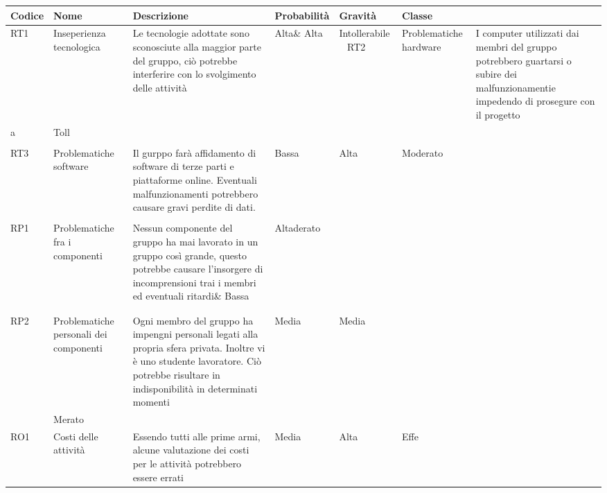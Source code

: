 \begin{longtable}[h]{|l|p{2.5cm}|p{4.4cm}|p{2.2cm}|l|l|}

		\hline
		\textbf{Codice} & \textbf{Nome}  & \textbf{Descrizione} & \textbf{Probabilità} & \textbf{Gravità} & \textbf{Classe} \\
		\hline
		RT1    & Inseperienza tecnologica & Le tecnologie adottate sono sconosciute alla maggior parte del gruppo, ciò potrebbe interferire con lo svolgimento delle  attività & Alta\& Alta    & Intollerabile  \	\hline
		RT2    & Problematiche hardware & I computer utilizzati dai membri del gruppo potrebbero guartarsi o subire dei malfunzionamentie impedendo di prosegure con il progetto\\                     a   & Toll\\                                                                                                                              	\hline   \\
		RT3    & Problematiche software & Il gurppo farà affidamento di software di terze parti e piattaforme online. Eventuali malfunzionamenti potrebbero causare gravi perdite di dati. & Bassa & Alta    & Moderato \\      \hline      \\
		RP1    & Problematiche fra i componenti & Nessun componente del gruppo ha mai lavorato in un gruppo così grande, questo potrebbe causare l'insorgere di incomprensioni trai i membri ed eventuali ritardi\& Bassa         & Altaderato \\                                                                                              \hline\\     \\
		RP2    & Problematiche personali dei componenti & Ogni membro del gruppo ha impengni personali legati alla propria sfera privata. Inoltre vi è uno studente lavoratore. Ciò potrebbe risultare in indisponibilità in determinati momenti& Media & Media\\ & Merato \\
		\hline
		RO1    & Costi delle attività & Essendo tutti alle prime armi, alcune valutazione dei costi per le attività potrebbero essere errati  & Media         & Alta    & Effe                                                                                                                                                                 \hline     \\

\end{longtable}
